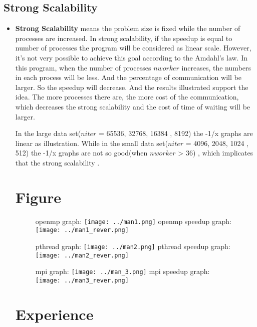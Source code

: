 \documentclass{article}
\begin{document}
	\subsection{Strong Scalability}
	\begin{itemize}
		\item
			{\bf Strong Scalability} means the problem size
			is fixed while the number of processes are
			increased. In strong scalability, if the speedup
			is equal to number of processes the program will
			be considered as linear scale. However, it's not
			very possible to achieve this goal according to
			the Amdahl's law. In this program, when the number
			of processes $nworker$ increases, the numbers in each
			process will be less. And the percentage of
			communication will be larger. So the speedup will
			decrease. And the results illustrated support the
			idea. The more processes there are, the more cost
			of the communication, which decreases the strong
			scalability and the cost of time of waiting will
			be larger.

			In the large data set($niter$ = 65536, 32768, 16384
			, 8192) the -1/x graphs are linear as illustration.
			While in the small data set($niter$ = 4096, 2048, 1024
			, 512) the -1/x graphs are not so good(when $nworker$ > 36)
			, which	implicates that the strong scalability .

\section{Figure}
	\begin{figure}[!ht]
		\centering
		openmp graph:
		\texttt{[image: ../man1.png]}
		openmp speedup graph:
		\texttt{[image: ../man1\_rever.png]}
	\end{figure}
	\clearpage
	\begin{figure}[!ht]
		\centering
		pthread graph:
		\texttt{[image: ../man2.png]}
		pthread speedup graph:
		\texttt{[image: ../man2\_rever.png]}
	\end{figure}
	\clearpage
	\begin{figure}[!ht]
		\centering
		mpi graph:
		\texttt{[image: ../man\_3.png]}
		mpi speedup graph:
		\texttt{[image: ../man3\_rever.png]}
	\end{figure}



\section{Experience}


\end{itemize}
\end{document}
